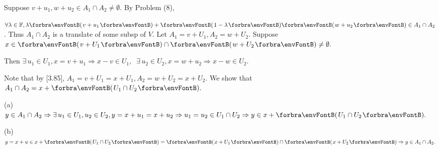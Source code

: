 \par\quad
Suppose $v+u_1,w+u_2\in A_1\cap A_2\neq\emptyset$. By Problem (8),\par\quad
$\forall\lambda\in\Fbb,\lambda\Par{v+u_1}+\Par{1-\lambda}\Par{w+u_2}\in A_1\cap A_2$. Thus $A_1\cap A_2$ is a translate of some subsp of $V.$\PfEnd\vspace{6pt}\quad
\Or Let $A_1=v+U_1,A_2=w+U_2.$ Suppose $x\in \Par{v+U_1}\cap \Par{w+U_2}\neq\emptyset.$\par\quad
Then $\exists\,u_1\in U_1,x=v+u_1\Rightarrow x-v\in U_1,\;\;\exists\,u_2\in U_2,x=w+u_2\Rightarrow x-w\in U_2$.\par\quad
Note that by [3.85], $A_1=v+U_1=x+U_1,A_2=w+U_2=x+U_2.$ We show that $A_1\cap A_2=x+\Par{U_1\cap U_2}.$\vspace{3pt}\par\quad
(a) $y\in A_1\cap A_2\Rightarrow\exists\,u_1\in U_1,u_2\in U_2,y=x+u_1=x+u_2\Rightarrow u_1=u_2\in U_1\cap U_2\Rightarrow y\in x+\Par{U_1\cap U_2}.$\vspace{3pt}\par\quad
(b) $y=x+u\in x+\Par{U_1\cap U_2}=\Par{x+U_1}\cap \Par{x+U_2}\Rightarrow y\in A_1\cap A_2.$\PfEnd
\SepLine

